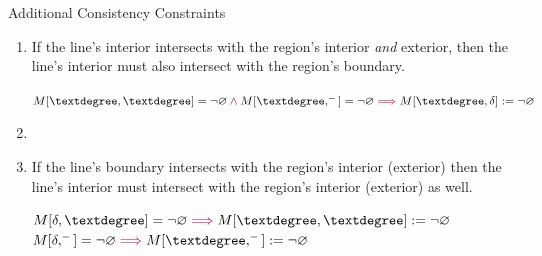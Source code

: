 	\begin{frame}{Additional Consistency Constraints}
		\begin{enumerate}
			\item If the line's interior intersects with the region's interior \textit{and} exterior, then the line's interior must also intersect with the region's boundary.
			\\ \vspace{6pt}
			\begin{center}
				$ M[\textdegree,\textdegree] = \NotEmpty \Highlight{{}\land{}} M[\textdegree,^{-}] = \NotEmpty \Highlight{\implies} M[\textdegree,\delta] := \NotEmpty $
			\end{center}
			\item[ ]
			\item If the line's boundary intersects with the region's interior (exterior) then the line's interior must intersect with the region's interior (exterior) as well.
			\\ \vspace{6pt}
			\begin{center}
				$ M[\delta,\textdegree] = \NotEmpty \Highlight{\implies} M[\textdegree,\textdegree] := \NotEmpty $ \\
				$ M[\delta, ^{-}] = \NotEmpty \Highlight{\implies} M[\textdegree,^{-}] := \NotEmpty $
			\end{center}
		\end{enumerate}
		
	\end{frame}
	
	
